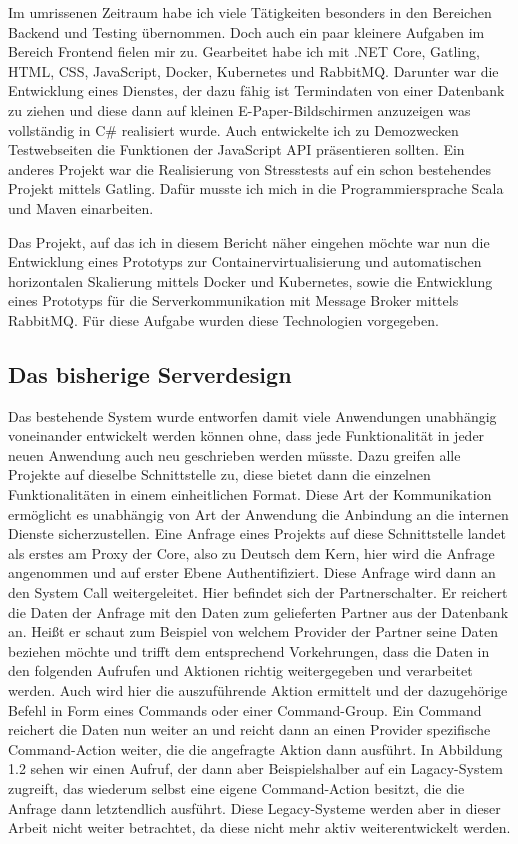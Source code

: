 \documentclass[12pt,a4paper]{scrartcl}
\begin{document}
Im umrissenen Zeitraum habe ich viele Tätigkeiten besonders in den Bereichen Backend und Testing übernommen. Doch auch ein paar kleinere Aufgaben im Bereich Frontend fielen mir zu. Gearbeitet habe ich mit .NET Core, Gatling, HTML, CSS, JavaScript, Docker, Kubernetes und RabbitMQ. 
Darunter war die Entwicklung eines Dienstes, der dazu fähig ist Termindaten von einer Datenbank zu ziehen und diese dann auf kleinen E-Paper-Bildschirmen anzuzeigen was vollständig in C\# realisiert wurde. Auch entwickelte ich zu Demozwecken Testwebseiten die Funktionen der JavaScript API präsentieren sollten. Ein anderes Projekt war die Realisierung von Stresstests auf ein schon bestehendes Projekt mittels Gatling. Dafür musste ich mich in die Programmiersprache Scala und Maven einarbeiten. 

Das Projekt, auf das ich in diesem Bericht näher eingehen möchte war nun die Entwicklung eines Prototyps zur Containervirtualisierung und automatischen horizontalen Skalierung mittels Docker und Kubernetes, sowie die Entwicklung eines Prototyps für die Serverkommunikation mit Message Broker mittels RabbitMQ. Für diese Aufgabe wurden diese Technologien vorgegeben. 

\subsection{Das bisherige Serverdesign}
Das bestehende System wurde entworfen damit viele Anwendungen unabhängig voneinander entwickelt werden können ohne, dass jede Funktionalität in jeder neuen Anwendung auch neu geschrieben werden müsste. Dazu greifen alle Projekte auf dieselbe Schnittstelle zu, diese bietet dann die einzelnen Funktionalitäten in einem einheitlichen Format. Diese Art der Kommunikation ermöglicht es unabhängig von Art der Anwendung die Anbindung an die internen Dienste sicherzustellen. Eine Anfrage eines Projekts auf diese Schnittstelle landet als erstes am Proxy der Core, also zu Deutsch dem Kern, hier wird die Anfrage angenommen und auf erster Ebene Authentifiziert. Diese Anfrage wird dann an den System Call weitergeleitet. Hier befindet sich der Partnerschalter. Er reichert die Daten der Anfrage mit den Daten zum gelieferten Partner aus der Datenbank an. Heißt er schaut zum Beispiel von welchem Provider der Partner seine Daten beziehen möchte und trifft dem entsprechend Vorkehrungen, dass die Daten in den folgenden Aufrufen und Aktionen richtig weitergegeben und verarbeitet werden. Auch wird hier die auszuführende Aktion ermittelt und der dazugehörige Befehl in Form eines Commands oder einer Command-Group. Ein Command reichert die Daten nun weiter an und reicht dann an einen Provider spezifische Command-Action weiter, die die angefragte Aktion dann ausführt. In Abbildung 1.2 sehen wir einen Aufruf, der dann aber Beispielshalber auf ein Lagacy-System zugreift, das wiederum selbst eine eigene Command-Action besitzt, die die Anfrage dann letztendlich ausführt. Diese Legacy-Systeme werden aber in dieser Arbeit nicht weiter betrachtet, da diese nicht mehr aktiv weiterentwickelt werden.
\end{document}

